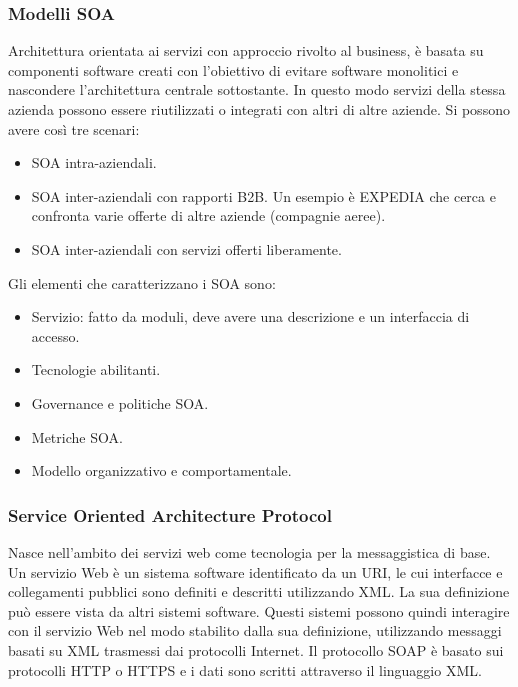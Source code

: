 \documentclass{article}
\begin{document}
		\subsubsection{Modelli SOA}
		Architettura orientata ai servizi con approccio rivolto al business, è basata su componenti software creati con l'obiettivo di evitare software monolitici e nascondere l'architettura centrale sottostante. 
		In questo modo servizi della stessa azienda possono essere riutilizzati o integrati con altri di altre aziende.
		Si possono avere così tre scenari:
		\begin{itemize}
		    \item SOA intra-aziendali.
		    \item SOA inter-aziendali con rapporti B2B. Un esempio è EXPEDIA che cerca e confronta varie offerte di altre aziende (compagnie aeree).
		    \item SOA inter-aziendali con servizi offerti liberamente.
		\end{itemize}
		Gli elementi che caratterizzano i SOA sono:
		\begin{itemize}
		    \item Servizio: fatto da moduli, deve avere una descrizione e un interfaccia di accesso.
		    \item Tecnologie abilitanti.
		    \item Governance e politiche SOA.
		    \item Metriche SOA.
		    \item Modello organizzativo e comportamentale.
		\end{itemize}
		
		\subsubsection{Service Oriented Architecture Protocol}
		Nasce nell'ambito dei servizi web come tecnologia per la messaggistica di base.\\
		Un servizio Web è un sistema software identificato da un URI, le cui interfacce e collegamenti pubblici sono definiti e descritti utilizzando XML. La sua definizione può essere vista da altri sistemi software.
		Questi sistemi possono quindi interagire con il servizio Web nel modo stabilito dalla sua definizione, utilizzando messaggi basati su XML trasmessi dai protocolli Internet.
		Il protocollo SOAP è basato sui protocolli HTTP o HTTPS e i dati sono scritti attraverso il linguaggio XML.
		
\end{document}
